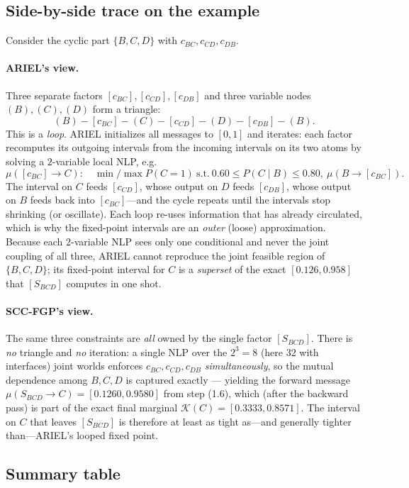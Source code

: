 \documentclass[11pt]{article}
\newcommand{\cK}{\mathcal{K}}
\begin{document}
\subsection{Side-by-side trace on the example}

Consider the cyclic part $\{B,C,D\}$ with $c_{BC},c_{CD},c_{DB}$.

\paragraph{ARIEL's view.} Three separate factors
$[c_{BC}],[c_{CD}],[c_{DB}]$ and three variable nodes $(B),(C),(D)$ form a
triangle:
\[
  (B)\!-\![c_{BC}]\!-\!(C)\!-\![c_{CD}]\!-\!(D)\!-\![c_{DB}]\!-\!(B).
\]
This is a \emph{loop}. ARIEL initializes all messages to $[0,1]$ and iterates:
each factor recomputes its outgoing intervals from the incoming intervals on
its two atoms by solving a $2$-variable local NLP, e.g.
\[
  \mu([c_{BC}]\!\to\!C):\quad \min/\max P(C{=}1)\ \text{s.t.}\
  0.60\le P(C\mid B)\le 0.80,\ \mu(B\!\to\![c_{BC}]).
\]
The interval on $C$ feeds $[c_{CD}]$, whose output on $D$ feeds $[c_{DB}]$,
whose output on $B$ feeds back into $[c_{BC}]$---and the cycle repeats until
the intervals stop shrinking (or oscillate). Each loop re-uses information
that has already circulated, which is why the fixed-point intervals are an
\emph{outer} (loose) approximation. Because each $2$-variable NLP sees only one
conditional and never the joint coupling of all three, ARIEL cannot reproduce
the joint feasible region of $\{B,C,D\}$; its fixed-point interval for $C$ is a
\emph{superset} of the exact $[0.126,0.958]$ that $[S_{BCD}]$ computes in one
shot.

\paragraph{SCC-FGP's view.} The same three constraints are \emph{all} owned by
the single factor $[S_{BCD}]$. There is \emph{no} triangle and \emph{no}
iteration: a single NLP over the $2^3=8$ (here $32$ with interfaces) joint
worlds enforces $c_{BC},c_{CD},c_{DB}$ \emph{simultaneously}, so the mutual
dependence among $B,C,D$ is captured exactly --- yielding the forward message
$\mu(S_{BCD}\!\to\!C)=[0.1260,0.9580]$ from step (1.6), which (after the
backward pass) is part of the exact final marginal $\cK(C)=[0.3333,0.8571]$.
The interval on $C$ that leaves $[S_{BCD}]$ is therefore at least as tight
as---and generally tighter than---ARIEL's looped fixed point.

\subsection{Summary table}
\end{document}
